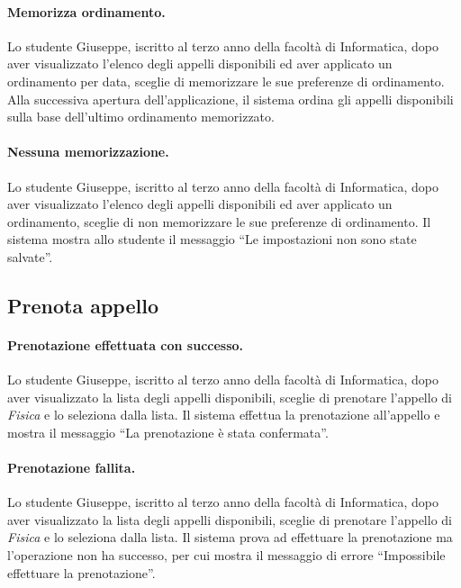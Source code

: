 \paragraph{Memorizza ordinamento.}
Lo studente Giuseppe, iscritto al terzo anno della facoltà di Informatica, dopo aver visualizzato l’elenco degli appelli disponibili ed aver applicato un ordinamento per data, sceglie di memorizzare le sue preferenze di ordinamento. Alla successiva apertura dell’applicazione, il sistema ordina gli appelli disponibili sulla base dell'ultimo ordinamento memorizzato.

\paragraph{Nessuna memorizzazione.}
Lo studente Giuseppe, iscritto al terzo anno della facoltà di Informatica, dopo aver visualizzato l’elenco degli appelli disponibili ed aver applicato un ordinamento, sceglie di non memorizzare le sue preferenze di ordinamento. Il sistema mostra allo studente il messaggio “Le impostazioni non sono state salvate”.


\subsection{Prenota appello}
\paragraph{Prenotazione effettuata con successo.}
Lo studente Giuseppe, iscritto al terzo anno della facoltà di Informatica, dopo aver visualizzato la lista degli appelli disponibili, sceglie di prenotare l’appello di \textit{Fisica} e lo seleziona dalla lista. Il sistema effettua la prenotazione all’appello e mostra il messaggio “La prenotazione è stata confermata”.

\paragraph{Prenotazione fallita.}
Lo studente Giuseppe, iscritto al terzo anno della facoltà di Informatica, dopo aver visualizzato la lista degli appelli disponibili, sceglie di prenotare l’appello di \textit{Fisica} e lo seleziona dalla lista. Il sistema prova ad effettuare la prenotazione ma l’operazione non ha successo, per cui mostra il messaggio di errore “Impossibile effettuare la prenotazione”.

